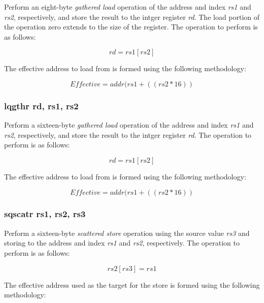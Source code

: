 \documentclass{article}
\begin{document}
Perform an eight-byte \emph{gathered load} operation of the address and
index \emph{rs1} and \emph{rs2}, respectively, and store the result
to the intger register \emph{rd}.  The load portion of the operation
zero extends to the size of the register.
The operation to perform is as follows:

\begin{equation}
rd = rs1[rs2]
\end{equation}

The effective address to load
from is formed using the following methodology:

\begin{equation}
Effective = addr(rs1 + ((rs2 * 16))
\end{equation}

\subsubsection{lqgthr rd, rs1, rs2}

Perform a sixteen-byte \emph{gathered load} operation of the address and
index \emph{rs1} and \emph{rs2}, respectively, and store the result
to the intger register \emph{rd}.
The operation to perform is as follows:

\begin{equation}
rd = rs1[rs2]
\end{equation}

The effective address to load
from is formed using the following methodology:

\begin{equation}
Effective = addr(rs1 + ((rs2 * 16))
\end{equation}

\subsubsection{sqscatr rs1, rs2, rs3}

Perform a sixteen-byte \emph{scattered store} operation using the 
source value \emph{rs3} and storing to the address and index
\emph{rs1} and \emph{rs2}, respectively.  The operation to
perform is as follows: 

\begin{equation}
rs2[rs3] = rs1
\end{equation}

The effective address used as the target
for the store is formed using the following methodology:
\end{document}
